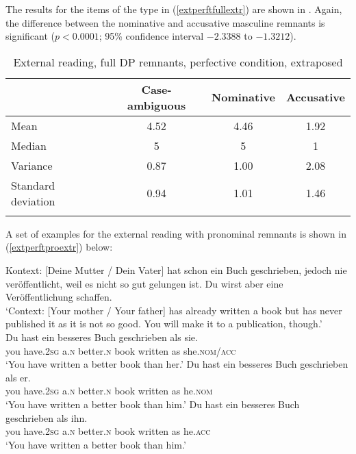 The results for the items of the type in (\ref{extperftfullextr}) are shown in .
Again, the difference between the nominative and accusative masculine remnants is significant ($p<0.0001$; 95\% confidence interval $-2.3388$ to $-1.3212$). 

\begin{table}
\begin{tabular}{l *3{S[table-format=1.2]}}
\lsptoprule
{} & {Case-ambiguous} & {Nominative} & {Accusative}\\
\midrule
Mean & 4.52 & 4.46 & 1.92\\
Median & 5 & 5 & 1\\
Variance & 0.87 & 1.00 & 2.08\\
Standard deviation & 0.94 & 1.01 & 1.46\\
\lspbottomrule
\end{tabular}
\caption{External reading, full DP remnants, perfective condition, extraposed}
\label{tableextperftfullextr}
\end{table} 


A set of examples for the external reading with pronominal remnants is shown in (\ref{extperftproextr}) below:

\ea Kontext: [Deine Mutter / Dein Vater] hat schon ein Buch geschrieben, jedoch nie veröffentlicht, weil es nicht so gut gelungen ist. Du wirst aber eine Veröffentlichung schaffen. \label{extperftproextr}\\
`Context: [Your mother / Your father] has already written a book but has never published it as it is not so good. You will make it to a publication, though.'\\
\ea \gll Du hast ein besseres Buch geschrieben als sie. \label{extperftproextrambig}\\
you have.\textsc{2sg} a.\textsc{n} better.\textsc{n} book written as she.\textsc{nom/acc}\\
\glt `You have written a better book than her.'
\ex \gll Du hast ein besseres Buch geschrieben als er. \label{extperftproextrnom}\\
you have.\textsc{2sg} a.\textsc{n} better.\textsc{n} book written as he.\textsc{nom}\\
\glt `You have written a better book than him.'
\ex \gll Du hast ein besseres Buch geschrieben als ihn. \label{extperftproextracc}\\
you have.\textsc{2sg} a.\textsc{n} better.\textsc{n} book written as he.\textsc{acc}\\
\glt `You have written a better book than him.'
\z
\z

